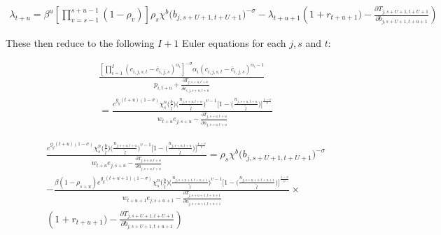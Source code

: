 \documentclass[letterpaper,11pt]{article}
\theoremstyle{definition}
\begin{document}
\begin{equation}
  \begin{split}
  \lambda_{t+u} = \beta^u\left[\prod_{v=s-1}^{s+u-1}(1-\rho_v)\right] \rho_s\chi^b\bigl(b_{j,s+U+1,t+U+1}\bigr)^{-\sigma} - \lambda_{t+u+1} \left( 1 + r_{t+u+1}) - \frac{\partial T_{j,s+U+1,t+U+1}}{\partial b_{j,s+U+1,t+u+1}} \right)
    \end{split}  \nonumber
\end{equation}

These then reduce to the following $I+1$ Euler equations for each $j,s$ and $t$:

\begin{equation}\label{EqcEuler}
  \begin{split}
  & \frac{ \left[ \prod_{i=1}^I \left( c_{i,j,s,t} - \bar c_{i,j,s} \right) ^{\alpha_i} \right]^{-\sigma}\alpha_i \left( c_{i,j,s,t} - \bar c_{i,j,s} \right)^{\alpha_i-1} } { p_{i,t+u} + \frac{\partial T_{j,s+u,t+u}}{\partial c_{i,j,s+u,t+u}} } \\
  & = \frac{ e^{g_y (t+u)(1-\sigma)}\chi^n_{s}\biggl(\frac{b}{\tilde{l}}\biggr)\biggl(\frac{n_{j,s+u,t+u}}{\tilde{l}}\biggr)^{v-1}\Biggl[1 - \biggl(\frac{n_{j,s+u,t+u}}{\tilde{l}}\biggr)\Biggr]^{\frac{1-v}{v}} } { w_{t+u} e_{j,s+u} - \frac{\partial T_{j,s+u,t+u}}{\partial n_{j,s+u,t+u}} }
   \end{split}
\end{equation}

\begin{equation}\label{EqbEuler}
  \begin{split}
  & \frac{ e^{g_y (t+u)(1-\sigma)}\chi^n_{s}\biggl(\frac{b}{\tilde{l}}\biggr)\biggl(\frac{n_{j,s+u,t+u}}{\tilde{l}}\biggr)^{v-1}\Biggl[1 - \biggl(\frac{n_{j,s+u,t+u}}{\tilde{l}}\biggr)\Biggr]^{\frac{1-v}{v}} } { w_{t+u} e_{j,s+u} - \frac{\partial T_{j,s+u,t+u}}{\partial n_{j,s+u,t+u}} } = \rho_s\chi^b\bigl(b_{j,s+U+1,t+U+1}\bigr)^{-\sigma}\\ 
  &  - \frac{ \beta(1-\rho_{s+u}) e^{g_y (t+u+1)(1-\sigma)}\chi^n_{s}\biggl(\frac{b}{\tilde{l}}\biggr)\biggl(\frac{n_{j,s+u+1,t+u+1}}{\tilde{l}}\biggr)^{v-1}\Biggl[1 - \biggl(\frac{n_{j,s+u+1,t+u+1}}{\tilde{l}}\biggr)\Biggr]^{\frac{1-v}{v}} } { w_{t+u+1} e_{j,s+u+1} - \frac{\partial T_{j,s+u+1,t+u+1}}{\partial n_{j,s+u+1,t+u+1}} } \times \\
  & \left( 1 + r_{t+u+1}) - \frac{\partial T_{j,s+U+1,t+U+1}}{\partial b_{j,s+U+1,t+u+1}} \right)
  \end{split}
\end{equation}
\end{document}
